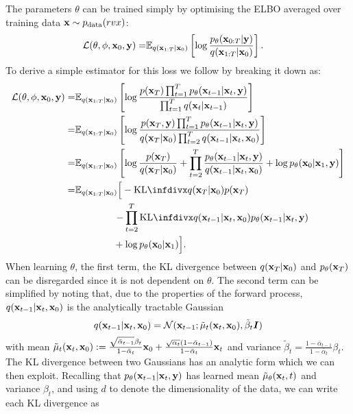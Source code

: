 The parameters $\theta$ can be trained simply by optimising the ELBO averaged over training data ${\mathbf{x}} \sim p_{\rm{data}}(rvx)$:
\begin{align}
    {\mathcal{L}}(\theta, \phi, {\mathbf{x}}_0, {\mathbf{y}}) =& \mathbb{E}_{q({\mathbf{x}}_{1:T}|{\mathbf{x}}_0)} \left[ \log \frac{p_\theta({\mathbf{x}}_{0:T}|{\mathbf{y}})}{q({\mathbf{x}}_{1:T}|{\mathbf{x}}_0)} \right].
\end{align}
To derive a simple estimator for this loss we follow \citet{ho2020denoising} by breaking it down as:
\begin{align}
    \gL(\theta, \phi, \rvx_0, \rvy) =& \EX_{q(\rvx_{1:T}|\rvx_0)} \left[ \log \frac{p(\rvx_T) \prod_{t=1}^T p_\theta(\rvx_{t-1}|\rvx_t, \rvy)}{\prod_{t=1}^T q(\rvx_t|\rvx_{t-1})} \right] \\
    =& \EX_{q(\rvx_{1:T}|\rvx_0)} \left[ \log \frac{p(\rvx_T, \rvy) \prod_{t=1}^T p_\theta(\rvx_{t-1}|\rvx_t, \rvy)}{q(\rvx_T|\rvx_0) \prod_{t=2}^T q(\rvx_{t-1}|\rvx_t,\rvx_0)} \right] \\
    =& \EX_{q(\rvx_{1:T}|\rvx_0)} \left[ \log \frac{p(\rvx_T)}{q(\rvx_T|\rvx_0)} + \prod_{t=2}^T \frac{p_\theta(\rvx_{t-1}|\rvx_t, \rvy)}{q(\rvx_{t-1}|\rvx_t,\rvx_0)} + \log p_\theta(\rvx_0|\rvx_1, \rvy) \right] \\
    =& \EX_{q(\rvx_{1:T}|\rvx_0)} \Big[ -\kl{q(\rvx_T|\rvx_0)}{p(\rvx_T)} \nonumber \\
    &\qquad\qquad \left. - \prod_{t=2}^T \kl{q(\rvx_{t-1}|\rvx_t,\rvx_0)}{p_\theta(\rvx_{t-1}|\rvx_t, \rvy)} \right. \nonumber \\
    &\qquad\qquad + \log p_\theta(\rvx_0|\rvx_1) \Big].
\end{align}
When learning $\theta$, the first term, the KL divergence between $q({\mathbf{x}}_T|{\mathbf{x}}_0)$ and $p_\theta({\mathbf{x}}_T)$ can be disregarded since it is not dependent on $\theta$. 
The second term can be simplified by noting that, due to the properties of the forward process, $q({\mathbf{x}}_{t-1}|{\mathbf{x}}_t,{\mathbf{x}}_0)$ is the analytically tractable Gaussian
\begin{equation}
    q({\mathbf{x}}_{t-1}|{\mathbf{x}}_t, {\mathbf{x}}_0) = {\mathcal{N}} ( {\mathbf{x}}_{t-1} ; \tilde{\mathbf{\mu}}_t({\mathbf{x}}_t,{\mathbf{x}}_0), \tilde{\beta}_t {\bm{I}} )
\end{equation}
with mean $\tilde{\mathbf{\mu}}_t({\mathbf{x}}_t,{\mathbf{x}}_0) := \frac{\sqrt{\bar{\alpha}_{t-1}}\beta_t}{1-\bar{\alpha}_t}{\mathbf{x}}_0 + \frac{\sqrt{\alpha_t}(1-\bar{\alpha}_{t-1})}{1-\bar{\alpha}_t}{\mathbf{x}}_t$ and variance $\tilde{\beta}_t = \frac{1-\bar{\alpha}_{t-1}}{1-\bar{\alpha}_t} \beta_t$. The KL divergence between two Gaussians has an analytic form which we can then exploit. Recalling that $p_\theta({\mathbf{x}}_{t-1}|{\mathbf{x}}_t, {\mathbf{y}})$ has learned mean $\tilde{\mathbf{\mu}}_\theta({\mathbf{x}}_t, t)$ and variance $\beta_t$, and using $d$ to denote the dimensionality of the data, we can write each KL divergence as
